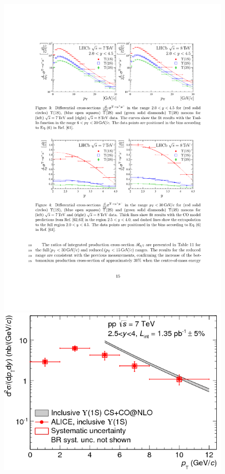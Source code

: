 \begin{figure}[h]
\begin{center}
  \includegraphics[height=0.25\textheight]{Chapters/pQuarkonia/lhcbUpsiPtTsallis.pdf}
  \includegraphics[height=0.23\textheight]{Chapters/pQuarkonia/AliceUpsiPtCSCONLO.png}

\end{center}
\end{figure}
